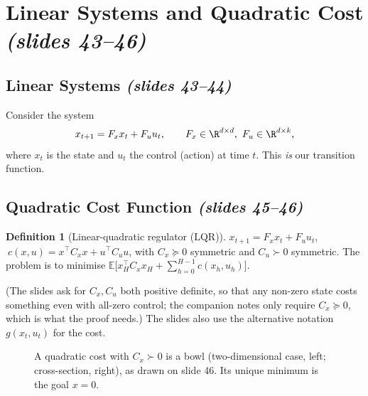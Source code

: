 \documentclass[11pt,a4paper]{article}
\newcommand{\E}{\mathbb{E}}
\newcommand{\slides}[1]{\emph{(slides #1)}}
\theoremstyle{plain}
\theoremstyle{definition}
\newtheorem{definition}[theorem]{Definition}
\theoremstyle{remark}
\begin{document}
\section{Linear Systems and Quadratic Cost \slides{43--46}}

\subsection{Linear Systems \slides{43--44}}

Consider the system
\[
x_{t+1}=F_x x_t+F_u u_t,\qquad F_x\in\R^{d\times d},\ F_u\in\R^{d\times k},
\]
where $x_t$ is the state and $u_t$ the control (action) at time $t$. This \emph{is} our transition function.

\subsection{Quadratic Cost Function \slides{45--46}}

\begin{definition}[Linear-quadratic regulator (LQR)]\label{def:lqr}
$x_{t+1}=F_xx_t+F_uu_t$, $\ c(x,u)=x^\top C_xx+u^\top C_uu$, with $C_x\succeq0$ symmetric and $C_u\succ0$ symmetric. The problem is to minimise $\E\big[x_H^\top C_xx_H+\sum_{h=0}^{H-1}c(x_h,u_h)\big]$.
\end{definition}

(The slides ask for $C_x,C_u$ both positive definite, so that any non-zero state costs something even with all-zero control; the companion notes only require $C_x\succeq0$, which is what the proof needs.) The slides also use the alternative notation $g(x_t,u_t)$ for the cost.

\begin{figure}[H]
\centering
\begin{minipage}{0.48\linewidth}
\centering
{}
\end{minipage}\hfill
\begin{minipage}{0.48\linewidth}
\centering
{}
\end{minipage}
\caption{A quadratic cost with $C_x\succ0$ is a bowl (two-dimensional case, left; cross-section, right), as drawn on slide 46. Its unique minimum is the goal $x=0$.}
\end{figure}
\end{document}
